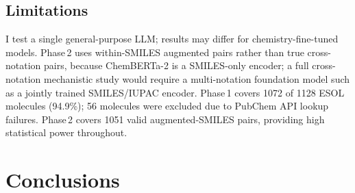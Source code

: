 \documentclass[twoside,twocolumn,9pt]{article}
\begin{document}
\subsection*{Limitations}

I test a single general-purpose LLM; results may differ for chemistry-fine-tuned models. Phase\,2 uses within-SMILES augmented pairs rather than true cross-notation pairs, because ChemBERTa-2 is a SMILES-only encoder; a full cross-notation mechanistic study would require a multi-notation foundation model such as a jointly trained SMILES/IUPAC encoder. Phase\,1 covers 1072 of 1128 ESOL molecules (94.9\%); 56 molecules were excluded due to PubChem API lookup failures. Phase\,2 covers 1051 valid augmented-SMILES pairs, providing high statistical power throughout.

\section*{Conclusions}
\end{document}
